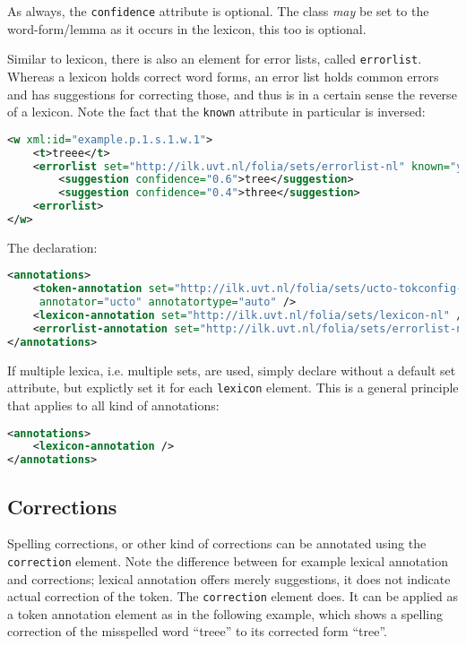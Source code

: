 \documentclass[a4paper,12pt]{report}
\begin{document}
As always, the \texttt{confidence} attribute is optional. The class \emph{may} be set to the word-form/lemma as it occurs in the lexicon, this too is optional.

Similar to lexicon, there is also an element for error lists, called \texttt{errorlist}. Whereas a lexicon holds correct word forms, an error list holds common errors and has suggestions for correcting those, and thus is in a certain sense the reverse of a lexicon. Note the fact that the \texttt{known} attribute in particular is inversed:


\begin{lstlisting}[language=xml]
<w xml:id="example.p.1.s.1.w.1">
    <t>treee</t>
    <errorlist set="http://ilk.uvt.nl/folia/sets/errorlist-nl" known="yes">    
        <suggestion confidence="0.6">tree</suggestion>
        <suggestion confidence="0.4">three</suggestion>
    <errorlist>
</w>
\end{lstlisting}

The declaration:

\begin{lstlisting}[language=xml]
<annotations>
    <token-annotation set="http://ilk.uvt.nl/folia/sets/ucto-tokconfig-nl"
     annotator="ucto" annotatortype="auto" />
    <lexicon-annotation set="http://ilk.uvt.nl/folia/sets/lexicon-nl" />
    <errorlist-annotation set="http://ilk.uvt.nl/folia/sets/errorlist-nl" />
</annotations>
\end{lstlisting}

If multiple lexica, i.e. multiple sets, are used, simply declare without a default set attribute, but explictly set it for each \texttt{lexicon} element. This is a general principle that applies to all kind of annotations:

\begin{lstlisting}[language=xml]
<annotations>
    <lexicon-annotation />
</annotations>
\end{lstlisting}

\subsection{Corrections}

Spelling corrections, or other kind of corrections can be annotated using the \texttt{correction} element. Note the difference between for example lexical annotation and corrections; lexical annotation offers merely suggestions, it does not indicate actual correction of the token. The \texttt{correction} element does. It can be applied as a token annotation element as in the following example, which shows a spelling correction of the misspelled word ``treee'' to its corrected form ``tree''.
\end{document}
